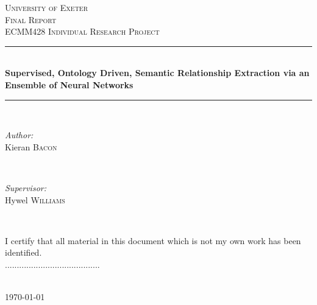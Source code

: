 \documentclass[12pt]{article} %
\newcommand{\HRule}{\rule{\linewidth}{0.5mm}} %
\begin{document}

\begin{titlepage}

\center %

\textsc{\LARGE University of Exeter}\\[1.0cm] %
\textsc{\Large Final Report}\\[0.5cm] %
\textsc{\large ECMM428 Individual Research Project}\\[0.5cm] %

\HRule \\[0.4cm]
{ \huge \bfseries Supervised, Ontology Driven, Semantic Relationship Extraction via an Ensemble of Neural Networks}\\[0.4cm] %
\HRule \\[1.5cm]

\begin{minipage}{0.4\textwidth}
\begin{flushleft} \large
\emph{Author:}\\
Kieran \textsc{Bacon}%
\end{flushleft}
\end{minipage}
~
\begin{minipage}{0.4\textwidth}
\begin{flushright} \large
\emph{Supervisor:} \\
Hywel \textsc{Williams} %
\end{flushright}
\end{minipage}\\[3cm]

\begin{minipage}{0.8\textwidth}
\centering
I certify that all material in this document which is not my own work has been identified.\\

\vspace{1cm}
........................................

\end{minipage}\\[2cm]


{\large \today}\\[1.5cm] %


\end{titlepage}
\end{document}
